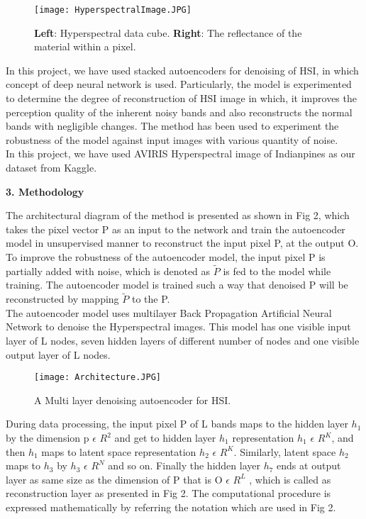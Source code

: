 \documentclass{article}
\begin{document}
\begin{figure}[htp]
    \centering
    \Large\texttt{[image: HyperspectralImage.JPG]}
    \caption{\textbf{Left}: Hyperspectral data cube. \textbf{Right}: The reflectance of the material within a pixel.}
    \label{fig:HyperspectralImage}
\end{figure}


In this project, we have used stacked autoencoders for denoising of HSI, in which concept of deep neural network is used. Particularly, the model is experimented to determine the degree of reconstruction of HSI image in which, it improves the perception quality of the inherent noisy bands and also reconstructs the normal bands with negligible changes. The method has been used to experiment the robustness of the model against input images with various quantity of noise.\\

In this project, we have used AVIRIS Hyperspectral image of Indianpines as our dataset from Kaggle.\\

\begin{flushleft}
\textbf{\large 3. Methodology}
\end{flushleft}

The architectural diagram of the method is presented as shown in Fig 2, which takes the pixel vector P as an input to the network and train the autoencoder model in unsupervised manner to reconstruct the input pixel P, at the output O. To improve the robustness of the autoencoder model, the input pixel P is partially added with noise, which is denoted as $\tilde{P}$ is fed to the model while training. The autoencoder model is trained such a way that denoised P will be reconstructed by mapping $\tilde{P}$ to the P.\\

The autoencoder model uses multilayer Back Propagation Artificial Neural Network to denoise the Hyperspectral images. This model has one visible input layer of L nodes, seven hidden layers of different number of nodes and one visible output layer of L nodes.\\


\begin{figure}[htp]
    \centering
    \Large\texttt{[image: Architecture.JPG]}
    \caption{A Multi layer denoising autoencoder for HSI.}
    \label{fig:Architecture}
\end{figure}

During data processing, the input pixel P of L bands maps to  the hidden layer $h_{1}$ by the  dimension p $\epsilon$ ${R}^2$ and get to hidden layer $h_{1}$ representation $h_{1}$ $\epsilon$ ${R}^K$, and then $h_{1}$ maps to latent space representation $h_{2}$ $\epsilon$ ${R}^K$. Similarly, latent space $h_{2}$ maps to $h_{3}$ by $h_{3}$ $\epsilon$ ${R}^N$ and so on. Finally the hidden layer $h_{7}$ ends at output layer as same size as the dimension of P that is O $\epsilon$ ${R}^L$ , which is called as reconstruction layer as presented in Fig 2. The computational procedure is expressed mathematically by referring the notation which are used in Fig 2.\\
\end{document}

